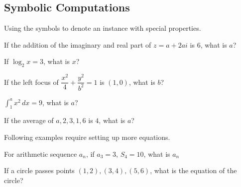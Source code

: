 \subsection{Symbolic Computations}

Using the symbols to denote an instance with special properties.

\begin{example}
  If the addition of the imaginary and real part of $z = a + 2ai$ is 6, what is $a$?
\end{example}

\begin{example}
  If $\log_2{x} = 3$, what is $x$?
\end{example}

\begin{example}
  If the left focus of $\dfrac{x^2}{4} + \dfrac{y^2}{b^2} = 1$ is $(1, 0)$, what is $b$?
\end{example}

\begin{example}
  $\displaystyle \int_1^a x^2 \, dx = 9 $, what is $a$?
\end{example}

\begin{example}
  If the average of $a, 2, 3, 1, 6$ is $4$, what is $a$?
\end{example}

Following examples require setting up more equations.

\begin{example}
  For arithmetic sequence $a_n$, if $a_3 = 3$, $S_4=10$, what is $a_n$
\end{example}

\begin{example}
  If a circle passes points $(1,2), (3,4), (5,6)$, what is the equation of the circle?
\end{example}
